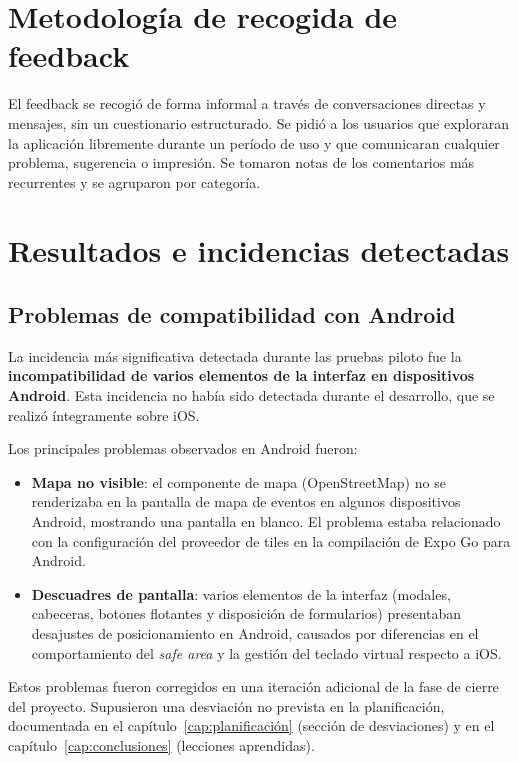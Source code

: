\section{Metodología de recogida de feedback}

El feedback se recogió de forma informal a través de conversaciones directas y mensajes, sin un cuestionario estructurado. Se pidió a los usuarios que exploraran la aplicación libremente durante un período de uso y que comunicaran cualquier problema, sugerencia o impresión. Se tomaron notas de los comentarios más recurrentes y se agruparon por categoría.

\section{Resultados e incidencias detectadas}

\subsection{Problemas de compatibilidad con Android}

La incidencia más significativa detectada durante las pruebas piloto fue la \textbf{incompatibilidad de varios elementos de la interfaz en dispositivos Android}. Esta incidencia no había sido detectada durante el desarrollo, que se realizó íntegramente sobre iOS.

Los principales problemas observados en Android fueron:

\begin{itemize}
    \item \textbf{Mapa no visible}: el componente de mapa (OpenStreetMap) no se renderizaba en la pantalla de mapa de eventos en algunos dispositivos Android, mostrando una pantalla en blanco. El problema estaba relacionado con la configuración del proveedor de tiles en la compilación de Expo Go para Android.

    \item \textbf{Descuadres de pantalla}: varios elementos de la interfaz (modales, cabeceras, botones flotantes y disposición de formularios) presentaban desajustes de posicionamiento en Android, causados por diferencias en el comportamiento del \textit{safe area} y la gestión del teclado virtual respecto a iOS.
\end{itemize}

Estos problemas fueron corregidos en una iteración adicional de la fase de cierre del proyecto. Supusieron una desviación no prevista en la planificación, documentada en el capítulo~\ref{cap:planificación} (sección de desviaciones) y en el capítulo~\ref{cap:conclusiones} (lecciones aprendidas).

